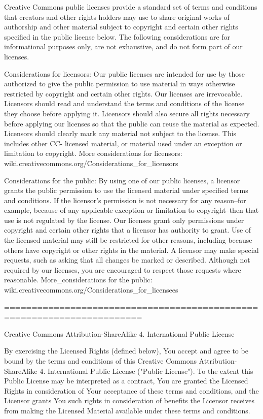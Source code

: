 Creative Commons public licenses provide a standard set of terms and conditions that creators and other rights holders may use to share original works of authorship and other material subject to copyright and certain other rights specified in the public license below. The following considerations are for informational purposes only, are not exhaustive, and do not form part of our licenses. \begin{DoxyVerb} Considerations for licensors: Our public licenses are
 intended for use by those authorized to give the public
 permission to use material in ways otherwise restricted by
 copyright and certain other rights. Our licenses are
 irrevocable. Licensors should read and understand the terms
 and conditions of the license they choose before applying it.
 Licensors should also secure all rights necessary before
 applying our licenses so that the public can reuse the
 material as expected. Licensors should clearly mark any
 material not subject to the license. This includes other CC-
 licensed material, or material used under an exception or
 limitation to copyright. More considerations for licensors:
wiki.creativecommons.org/Considerations_for_licensors

 Considerations for the public: By using one of our public
 licenses, a licensor grants the public permission to use the
 licensed material under specified terms and conditions. If
 the licensor's permission is not necessary for any reason--for
 example, because of any applicable exception or limitation to
 copyright--then that use is not regulated by the license. Our
 licenses grant only permissions under copyright and certain
 other rights that a licensor has authority to grant. Use of
 the licensed material may still be restricted for other
 reasons, including because others have copyright or other
 rights in the material. A licensor may make special requests,
 such as asking that all changes be marked or described.
 Although not required by our licenses, you are encouraged to
 respect those requests where reasonable. More_considerations
 for the public:
wiki.creativecommons.org/Considerations_for_licensees
\end{DoxyVerb}
 =======================================================================

Creative Commons Attribution-\/\+Share\+Alike 4. International Public License

By exercising the Licensed Rights (defined below), You accept and agree to be bound by the terms and conditions of this Creative Commons Attribution-\/\+Share\+Alike 4. International Public License ("{}\+Public \+License"{}). To the extent this Public License may be interpreted as a contract, You are granted the Licensed Rights in consideration of Your acceptance of these terms and conditions, and the Licensor grants You such rights in consideration of benefits the Licensor receives from making the Licensed Material available under these terms and conditions.

